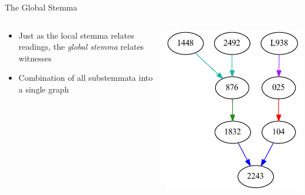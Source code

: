 \documentclass[10pt]{beamer}
\begin{document}
	\begin{frame}{The Global Stemma}
		\begin{columns}
			\begin{column}{0.45\textwidth}
				\begin{itemize}
					\item Just as the local stemma relates readings, the \emph{global stemma} relates witnesses
					\item Combination of all substemmata into a single graph
				\end{itemize}
			\end{column}
			\begin{column}{0.45\textwidth}
				\begin{center}
					\includegraphics[width=\textwidth]{../img/partial-global-stemma.pdf}
				\end{center}
			\end{column}
		\end{columns}
	\end{frame}
\end{document}
